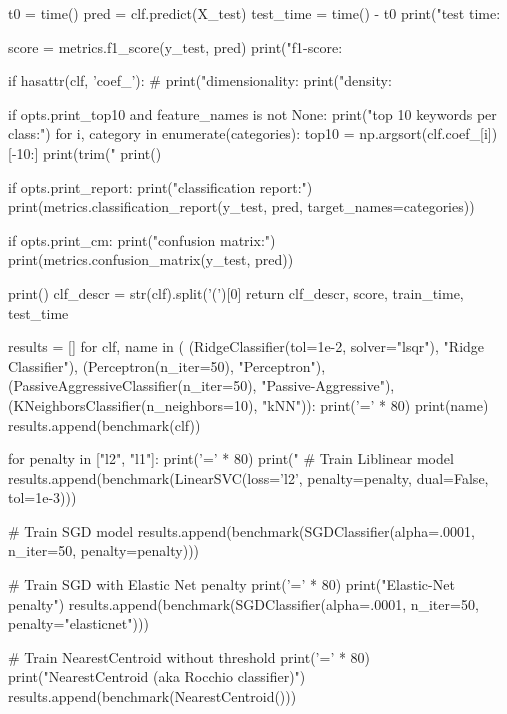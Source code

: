 \begin{pyverbatim}
    t0 = time()
    pred = clf.predict(X_test)
    test_time = time() - t0
    print("test time:  %

    score = metrics.f1_score(y_test, pred)
    print("f1-score:   %

    if hasattr(clf, 'coef_'):
#        print("dimensionality: %
        print("density: %

        if opts.print_top10 and feature_names is not None:
            print("top 10 keywords per class:")
            for i, category in enumerate(categories):
                top10 = np.argsort(clf.coef_[i])[-10:]
                print(trim("%
        print()

    if opts.print_report:
        print("classification report:")
        print(metrics.classification_report(y_test, pred,
                                            target_names=categories))

    if opts.print_cm:
        print("confusion matrix:")
        print(metrics.confusion_matrix(y_test, pred))

    print()
    clf_descr = str(clf).split('(')[0]
    return clf_descr, score, train_time, test_time


results = []
for clf, name in (
        (RidgeClassifier(tol=1e-2, solver="lsqr"), "Ridge Classifier"),
        (Perceptron(n_iter=50), "Perceptron"),
        (PassiveAggressiveClassifier(n_iter=50), "Passive-Aggressive"),
        (KNeighborsClassifier(n_neighbors=10), "kNN")):
    print('=' * 80)
    print(name)
    results.append(benchmark(clf))

for penalty in ["l2", "l1"]:
    print('=' * 80)
    print("%
    # Train Liblinear model
    results.append(benchmark(LinearSVC(loss='l2', penalty=penalty,
                                            dual=False, tol=1e-3)))

    # Train SGD model
    results.append(benchmark(SGDClassifier(alpha=.0001, n_iter=50,
                                           penalty=penalty)))

# Train SGD with Elastic Net penalty
print('=' * 80)
print("Elastic-Net penalty")
results.append(benchmark(SGDClassifier(alpha=.0001, n_iter=50,
                                       penalty="elasticnet")))

# Train NearestCentroid without threshold
print('=' * 80)
print("NearestCentroid (aka Rocchio classifier)")
results.append(benchmark(NearestCentroid()))


\end{pyverbatim}
